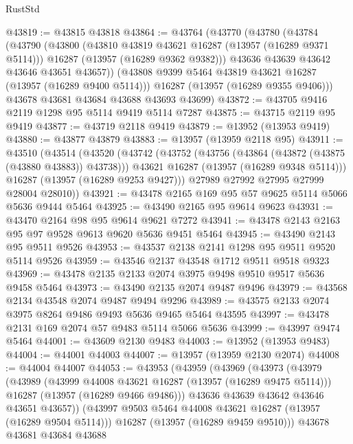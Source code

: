 \begin{lexlean}{RustStd}
\begin{coremodule}
@43819 := @43815 @43818
@43864 := @43764
    (@43770
      (@43780
        (@43784
          (@43790
            (@43800
              (@43810 @43819 @43621 @16287 (@13957 (@16289 @9371 @5114)))
              @16287
              (@13957 (@16289 @9362 @9382)))
            @43636
            @43639
            @43642
            @43646
            @43651
            @43657))
        (@43808 @9399 @5464 @43819 @43621 @16287 (@13957 (@16289 @9400 @5114)))
        @16287
        (@13957 (@16289 @9355 @9406)))
      @43678
      @43681
      @43684
      @43688
      @43693
      @43699)
@43872 := @43705 @9416 @2119 @1298 @95 @5114 @9419 @5114 @7287
@43875 := @43715 @2119 @95 @9419
@43877 := @43719 @2118 @9419
@43879 := @13952 (@13953 @9419)
@43880 := @43877 @43879
@43883 := @13957 (@13959 @2118 @95)
@43911 := @43510
    (@43514
      (@43520
        (@43742
          (@43752
            (@43756 (@43864 (@43872 (@43875 (@43880 @43883)) @43738)))
            @43621
            @16287
            (@13957 (@16289 @9348 @5114)))
          @16287
          (@13957 (@16289 @9253 @9427)))
        @27989
        @27992
        @27995
        @27999
        @28004
        @28010))
@43921 := @43478 @2165 @169 @95 @57 @9625 @5114 @5066 @5636 @9444 @5464
@43925 := @43490 @2165 @95 @9614 @9623
@43931 := @43470 @2164 @98 @95 @9614 @9621 @7272
@43941 := @43478 @2143 @2163 @95 @97 @9528 @9613 @9620 @5636 @9451 @5464
@43945 := @43490 @2143 @95 @9511 @9526
@43953 := @43537 @2138 @2141 @1298 @95 @9511 @9520 @5114 @9526
@43959 := @43546 @2137 @43548 @1712 @9511 @9518 @9323
@43969 := @43478 @2135 @2133 @2074 @3975 @9498 @9510 @9517 @5636 @9458 @5464
@43973 := @43490 @2135 @2074 @9487 @9496
@43979 := @43568 @2134 @43548 @2074 @9487 @9494 @9296
@43989 := @43575 @2133 @2074 @3975 @8264 @9486 @9493 @5636 @9465 @5464 @43595
@43997 := @43478 @2131 @169 @2074 @57 @9483 @5114 @5066 @5636
@43999 := @43997 @9474 @5464
@44001 := @43609 @2130 @9483
@44003 := @13952 (@13953 @9483)
@44004 := @44001 @44003
@44007 := @13957 (@13959 @2130 @2074)
@44008 := @44004 @44007
@44053 := @43953
    (@43959
      (@43969
        (@43973
          (@43979
            (@43989
              (@43999 @44008 @43621 @16287 (@13957 (@16289 @9475 @5114)))
              @16287
              (@13957 (@16289 @9466 @9486)))
            @43636
            @43639
            @43642
            @43646
            @43651
            @43657))
        (@43997 @9503 @5464 @44008 @43621 @16287 (@13957 (@16289 @9504 @5114)))
        @16287
        (@13957 (@16289 @9459 @9510)))
      @43678
      @43681
      @43684
      @43688

\end{coremodule}
\end{lexlean}
